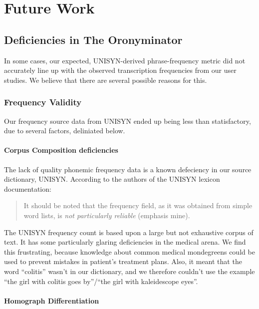 \chapter{Future Work}
\label{futureWork}

\section{Deficiencies in The Oronyminator}
\label{section:directImprovementsToMisheardMeOronymParseTree}

In some cases, our expected, UNISYN-derived phrase-frequency metric did not accurately line up with the observed transcription frequencies from our user studies.  We believe that there are several possible reasons for this.  

\subsection{Frequency Validity}
\label{subsection:frequencyValidity}
Our frequency source data from UNISYN ended up being less than statisfactory, due to several factors, deliniated below. 

\subsubsection{Corpus Composition deficiencies}
\label{futureWork:frequency:CorpusCompositionDeficiencies}

The lack of quality phonemic frequency data is a known defeciency in our source dictionary, UNISYN. According to the authors of the UNISYN lexicon documentation:
\begin{quote}
It should be noted that the frequency field, as it was obtained from simple word lists, is \emph{not particularly reliable} (emphasis mine).\cite{fitt_documentation_2000}  
\end{quote}
The UNISYN frequency count is based upon a large but not exhaustive corpus of text.  It has some particularly glaring deficiencies in the medical arena.  We find this frustrating, because knowledge about common medical mondegreens could be used to prevent mistakes in patient's treatment plans\cite{medicalMondegreensWhenIUseAWord}. Also, it meant that the word ``colitis'' wasn't in our dictionary, and we therefore couldn't use the example ``the girl with colitis goes by''/``the girl with kaleidescope eyes''. 


\subsubsection{Homograph Differentiation}
\label{futureWork:frequency:HomographDifferentiation}


